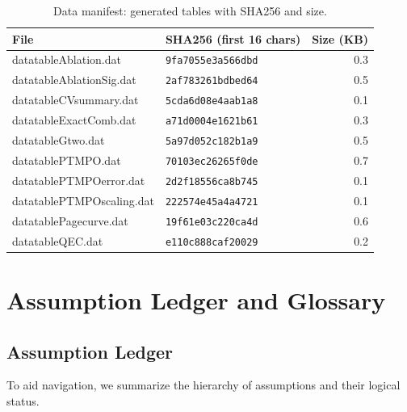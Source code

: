 \documentclass[11pt,a4paper]{article}
\theoremstyle{plain}
\theoremstyle{definition}
\theoremstyle{remark}
\begin{document}
\begin{table}[t]
\centering
\caption{Data manifest: generated tables with SHA256 and size.}
\label{tab:datamanifest}
\small
\begin{tabular}{llr}
\toprule
File & SHA256 (first 16 chars) & Size (KB) \\
\midrule
datatableAblation.dat & \texttt{\footnotesize 9fa7055e3a566dbd} & 0.3 \\
datatableAblationSig.dat & \texttt{\footnotesize 2af783261bdbed64} & 0.5 \\
datatableCVsummary.dat & \texttt{\footnotesize 5cda6d08e4aab1a8} & 0.1 \\
datatableExactComb.dat & \texttt{\footnotesize a71d0004e1621b61} & 0.3 \\
datatableGtwo.dat & \texttt{\footnotesize 5a97d052c182b1a9} & 0.5 \\
datatablePTMPO.dat & \texttt{\footnotesize 70103ec26265f0de} & 0.7 \\
datatablePTMPOerror.dat & \texttt{\footnotesize 2d2f18556ca8b745} & 0.1 \\
datatablePTMPOscaling.dat & \texttt{\footnotesize 222574e45a4a4721} & 0.1 \\
datatablePagecurve.dat & \texttt{\footnotesize 19f61e03c220ca4d} & 0.6 \\
datatableQEC.dat & \texttt{\footnotesize e110c888caf20029} & 0.2 \\
\bottomrule
\end{tabular}
\end{table}

\section{Assumption Ledger and Glossary}
\label{app:glossary}

\subsection{Assumption Ledger}
To aid navigation, we summarize the hierarchy of assumptions and their logical status.
\end{document}
